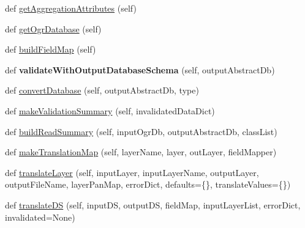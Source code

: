 \begin{DoxyCompactItemize}
\item 
def \mbox{\hyperlink{class_dsg_tools_1_1_factories_1_1_db_factory_1_1abstract_db_1_1_abstract_db_a3def3982594ab83c828bf0b6dce42ce6}{get\+Aggregation\+Attributes}} (self)
\item 
def \mbox{\hyperlink{class_dsg_tools_1_1_factories_1_1_db_factory_1_1abstract_db_1_1_abstract_db_a7cd3ddea6686c59a6369b16b8f40794a}{get\+Ogr\+Database}} (self)
\item 
def \mbox{\hyperlink{class_dsg_tools_1_1_factories_1_1_db_factory_1_1abstract_db_1_1_abstract_db_abe4a9ee62e78b6583a4e7c4f48dee173}{build\+Field\+Map}} (self)
\item 
\mbox{\label{class_dsg_tools_1_1_factories_1_1_db_factory_1_1abstract_db_1_1_abstract_db_a537e7e28a2ba296856eda6b7ea24b81a}} 
def {\bfseries validate\+With\+Output\+Database\+Schema} (self, output\+Abstract\+Db)
\item 
def \mbox{\hyperlink{class_dsg_tools_1_1_factories_1_1_db_factory_1_1abstract_db_1_1_abstract_db_af2cfa7cec72d89c8bff648a1ef6fd895}{convert\+Database}} (self, output\+Abstract\+Db, type)
\item 
def \mbox{\hyperlink{class_dsg_tools_1_1_factories_1_1_db_factory_1_1abstract_db_1_1_abstract_db_ab71a9b09b67acdec2d5e4152c6d61110}{make\+Validation\+Summary}} (self, invalidated\+Data\+Dict)
\item 
def \mbox{\hyperlink{class_dsg_tools_1_1_factories_1_1_db_factory_1_1abstract_db_1_1_abstract_db_a6041b5680c46ff5954a5f6d113aa16ba}{build\+Read\+Summary}} (self, input\+Ogr\+Db, output\+Abstract\+Db, class\+List)
\item 
def \mbox{\hyperlink{class_dsg_tools_1_1_factories_1_1_db_factory_1_1abstract_db_1_1_abstract_db_a617875c72a962ca88ff79b8238f9a623}{make\+Translation\+Map}} (self, layer\+Name, layer, out\+Layer, field\+Mapper)
\item 
def \mbox{\hyperlink{class_dsg_tools_1_1_factories_1_1_db_factory_1_1abstract_db_1_1_abstract_db_a4b923803b78556b8c1f812e44345c460}{translate\+Layer}} (self, input\+Layer, input\+Layer\+Name, output\+Layer, output\+File\+Name, layer\+Pan\+Map, error\+Dict, defaults=\{\}, translate\+Values=\{\})
\item 
def \mbox{\hyperlink{class_dsg_tools_1_1_factories_1_1_db_factory_1_1abstract_db_1_1_abstract_db_a93b2e3ffcb0f8c324930af3e656cca76}{translate\+DS}} (self, input\+DS, output\+DS, field\+Map, input\+Layer\+List, error\+Dict, invalidated=None)

\end{DoxyCompactItemize}

